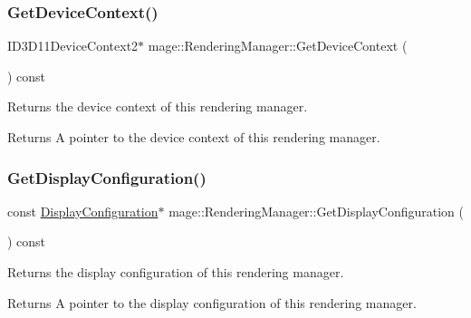 \subsubsection{\texorpdfstring{Get\+Device\+Context()}{GetDeviceContext()}}
{\footnotesize\ttfamily I\+D3\+D11\+Device\+Context2$\ast$ mage\+::\+Rendering\+Manager\+::\+Get\+Device\+Context (\begin{DoxyParamCaption}{ }\end{DoxyParamCaption}) const\hspace{0.3cm}{\ttfamily [noexcept]}}

Returns the device context of this rendering manager.

\begin{DoxyReturn}{Returns}
A pointer to the device context of this rendering manager. 
\end{DoxyReturn}
\hypertarget{classmage_1_1_rendering_manager_a4d134773977675c902974bb3f914370e}{}\label{classmage_1_1_rendering_manager_a4d134773977675c902974bb3f914370e} 
\subsubsection{\texorpdfstring{Get\+Display\+Configuration()}{GetDisplayConfiguration()}}
{\footnotesize\ttfamily const \hyperlink{structmage_1_1_display_configuration}{Display\+Configuration}$\ast$ mage\+::\+Rendering\+Manager\+::\+Get\+Display\+Configuration (\begin{DoxyParamCaption}{ }\end{DoxyParamCaption}) const\hspace{0.3cm}{\ttfamily [noexcept]}}

Returns the display configuration of this rendering manager.

\begin{DoxyReturn}{Returns}
A pointer to the display configuration of this rendering manager. 
\end{DoxyReturn}
\hypertarget{classmage_1_1_rendering_manager_a5b357f9f7e241945ac396cd09ba3be7e}{}\label{classmage_1_1_rendering_manager_a5b357f9f7e241945ac396cd09ba3be7e} 
